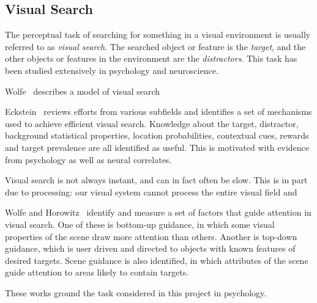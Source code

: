
\cite{chen_activevisionsurvey_2011}

\subsection{Visual Search}
\label{sec:visualsearch}


The perceptual task of searching for something in a visual environment is usually referred to as \textit{visual search}.
The searched object or feature is the \textit{target}, and the other objects or features in the environment are the \textit{distractors}.
This task has been studied extensively in psychology and neuroscience.

Wolfe~\cite{wolfe_guided_2021} describes a model of visual search


Eckstein~\cite{eckstein_visual_2011} reviews efforts from various subfields and identifies a set of mechanisms used to achieve efficient visual search.
Knowledge about the target, distractor, background statistical properties, location probabilities, contextual cues, rewards and target prevalence are all identified as useful.
This is motivated with evidence from psychology as well as neural correlates.

Visual search is not always instant, and can in fact often be slow.
This is in part due to processing: our visual system cannot process the entire visual field and 


Wolfe and Horowitz~\cite{wolfe_horowitz_2017} identify and measure a set of factors that guide attention in visual search.
One of these is bottom-up guidance, in which some visual properties of the scene draw more attention than others.
Another is top-down guidance, which is user driven and directed to objects with known features of desired targets.
Scene guidance is also identified, in which attributes of the scene guide attention to areas likely to contain targets. 

These works ground the task considered in this project in psychology.


